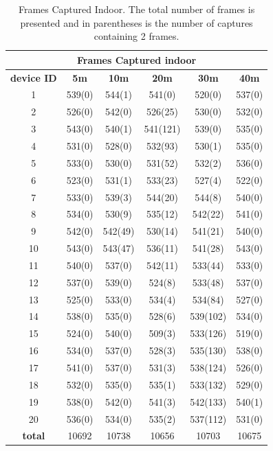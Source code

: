 \documentclass[a4paper, 12pt]{article}
\begin{document}
\begin{table}[H]
  \caption{Frames Captured Indoor. The total number of frames is presented and in parentheses is the number of captures containing 2 frames.}\label{tab:indoor}
  \begin{center}
    \begin{tabular}{|c|c|c|c|c|c|}
      \hline
      \multicolumn{6}{|c|}{\textbf{Frames Captured indoor}} \\
      \hline
      \textbf{device ID} & \textbf{5\unit{\m}} & \textbf{10\unit{\m}} & \textbf{20\unit{\m}} & \textbf{30\unit{\m}} & \textbf{40\unit{\m}} \\
      \hline
1& 539(0)&544(1)&541(0)&520(0)&537(0)
\\ \hline
2& 526(0)&542(0)&526(25)&530(0)&532(0)
\\ \hline
3& 543(0)&540(1)&541(121)&539(0)&535(0)
\\ \hline
4& 531(0)&528(0)&532(93)&530(1)&535(0)
\\ \hline
5& 533(0)&530(0)&531(52)&532(2)&536(0)
\\ \hline
6& 523(0)&531(1)&533(23)&527(4)&522(0)
\\ \hline
7& 533(0)&539(3)&544(20)&544(8)&540(0)
\\ \hline
8& 534(0)&530(9)&535(12)&542(22)&541(0)
\\ \hline
9& 542(0)&542(49)&530(14)&541(21)&540(0)
\\ \hline
10& 543(0)&543(47)&536(11)&541(28)&543(0)
\\ \hline
11& 540(0)&537(0)&542(11)&533(44)&533(0)
\\ \hline
12& 537(0)&539(0)&524(8)&533(48)&537(0)
\\ \hline
13& 525(0)&533(0)&534(4)&534(84)&527(0)
\\ \hline
14& 538(0)&535(0)&528(6)&539(102)&534(0)
\\ \hline
15& 524(0)&540(0)&509(3)&533(126)&519(0)
\\ \hline
16& 534(0)&537(0)&528(3)&535(130)&538(0)
\\ \hline
17& 541(0)&537(0)&531(3)&538(124)&526(0)
\\ \hline
18& 532(0)&535(0)&535(1)&533(132)&529(0)
\\ \hline
19& 538(0)&542(0)&541(3)&542(133)&540(1)
\\ \hline
20& 536(0)&534(0)&535(2)&537(112)&531(0)
\\ \hline
      \hline
      \textbf{total} & 10692&10738&10656&10703&10675\\ 
      \hline
    \end{tabular}
  \end{center}
\end{table}
\end{document}
